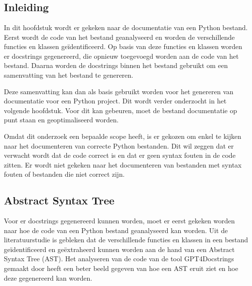 
\chapter{}%
\label{ch:bestanddocumentatie}

\section{Inleiding}
\label{sec:bestanddocumentatie-inleiding}
In dit hoofdstuk wordt er gekeken naar de documentatie van een Python bestand.
Eerst wordt de code van het bestand geanalyseerd en worden de verschillende functies en klassen geïdentificeerd.
Op basis van deze functies en klassen worden er docstrings gegenereerd, die opnieuw toegevoegd worden aan de code van het bestand.
Daarna worden de docstrings binnen het bestand gebruikt om een samenvatting van het bestand te genereren.

Deze samenvatting kan dan als basis gebruikt worden voor het genereren van documentatie voor een Python project.
Dit wordt verder onderzocht in het volgende hoofdstuk.
Voor dit kan gebeuren, moet de bestand documentatie op punt staan en geoptimaliseerd worden.

Omdat dit onderzoek een bepaalde scope heeft, is er gekozen om enkel te kijken naar het documenteren van correcte Python bestanden.
Dit wil zeggen dat er verwacht wordt dat de code correct is en dat er geen syntax fouten in de code zitten.
Er wordt niet gekeken naar het documenteren van bestanden met syntax fouten of bestanden die niet correct zijn.

\section{Abstract Syntax Tree}
\label{sec:bestanddocumentatie-ast}
Voor er docstrings gegenereerd kunnen worden, moet er eerst gekeken worden naar hoe de code van een Python bestand geanalyseerd kan worden.
Uit de literatuurstudie is gebleken dat de verschillende functies en klassen in een bestand geïdentificeerd en geëxtraheerd kunnen worden aan de hand van een Abstract Syntax Tree (AST).
Het analyseren van de code van de tool GPT4Docstrings gemaakt door \textcite{Trofficus2023} heeft een beter beeld gegeven van hoe een AST eruit ziet en hoe deze gegenereerd kan worden.

